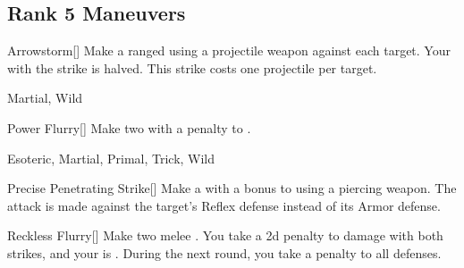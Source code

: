 \subsection{Rank 5 Maneuvers}

\lowercase{\hypertarget{maneuver:Arrowstorm}{}}\label{maneuver:Arrowstorm}
\hypertarget{maneuver:Arrowstorm}{}
\begin{freeability}[Rank 5]{Arrowstorm}[]
Make a ranged  using a projectile weapon against each target.
Your  with the strike is halved.
This strike costs one projectile per target.


 Martial, Wild
\end{freeability}
\vspace{0.25em}



\lowercase{\hypertarget{maneuver:Power Flurry}{}}\label{maneuver:Power Flurry}
\hypertarget{maneuver:Power Flurry}{}
\begin{freeability}[Rank 5]{Power Flurry}[]
Make two  with a  penalty to .


 Esoteric, Martial, Primal, Trick, Wild
\end{freeability}
\vspace{0.25em}



\lowercase{\hypertarget{maneuver:Precise Penetrating Strike}{}}\label{maneuver:Precise Penetrating Strike}
\hypertarget{maneuver:Precise Penetrating Strike}{}
\begin{freeability}[Rank 5]{Precise Penetrating Strike}[]
Make a  with a  bonus to  using a piercing weapon.
The attack is made against the target's Reflex defense instead of its Armor defense.


\end{freeability}
\vspace{0.25em}



\lowercase{\hypertarget{maneuver:Reckless Flurry}{}}\label{maneuver:Reckless Flurry}
\hypertarget{maneuver:Reckless Flurry}{}
\begin{freeability}[Rank 5]{Reckless Flurry}[]
Make two melee .
You take a \minus2d penalty to damage with both strikes, and your  is .
During the next round, you take a  penalty to all defenses.


\end{freeability}
\vspace{0.25em}



